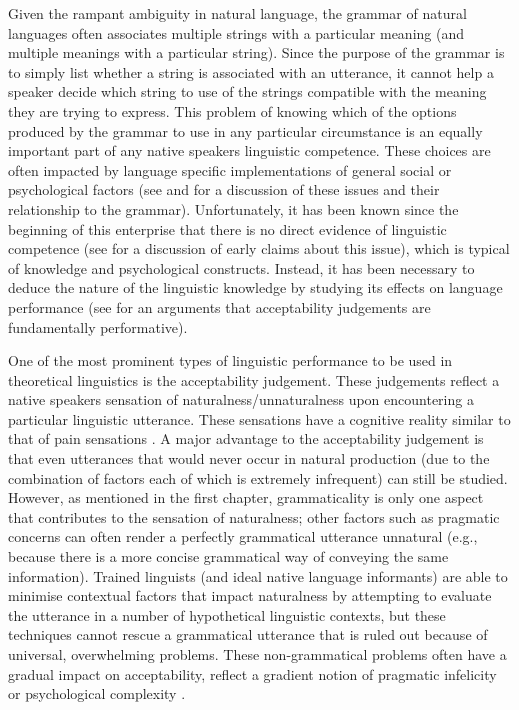 Given the rampant ambiguity in natural language, the grammar of natural languages often associates multiple strings with a particular meaning (and multiple meanings with a particular string). Since the purpose of the grammar is to simply list whether a string is associated with an utterance, it cannot help a speaker decide which string to use of the strings compatible with the meaning they are trying to express. This problem of knowing which of the options produced by the grammar to use in any particular circumstance is an equally important part of any native speakers linguistic competence. These choices are often impacted by language specific implementations of general social or psychological factors (see \cite{Bresnan.2007,Bresnan.2010,Zeevat.2014} and \cite{Tamminga.2016} for a discussion of these issues and their relationship to the grammar). Unfortunately, it has been known since the beginning of this enterprise that there is no direct evidence of linguistic competence (see \cite{Schutze.1996} for a discussion of early claims about this issue), which is typical of knowledge and psychological constructs. Instead, it has been necessary to deduce the nature of the linguistic knowledge by studying its effects on language performance (see \citealt{Stroud.2012,Phillips.2013, Phillips.2013b, Phillips.2013c} for an arguments that acceptability judgements are fundamentally performative).

One of the most prominent types of linguistic performance to be used in theoretical linguistics is the acceptability judgement. These judgements reflect a native speakers sensation of naturalness/unnaturalness upon encountering a particular linguistic utterance. These sensations have a cognitive reality similar to that of pain sensations \citep{Schutze.2014}. A major advantage to the acceptability judgement is that even utterances that would never occur in natural production (due to the combination of factors each of which is extremely infrequent) can still be studied. However, as mentioned in the first chapter, grammaticality is only one aspect that contributes to the sensation of naturalness; other factors such as pragmatic concerns can often render a perfectly grammatical utterance unnatural (e.g., because there is a more concise grammatical way of conveying the same information). Trained linguists (and ideal native language informants) are able to minimise contextual factors that impact naturalness by attempting to evaluate the utterance in a number of hypothetical linguistic contexts, but these techniques cannot rescue a grammatical utterance that is ruled out because of universal, overwhelming problems. These non-grammatical problems often have a gradual impact on acceptability, reflect a gradient notion of pragmatic infelicity or psychological complexity \citep{Bresnan.2007,Bresnan.2010,Schutze.2014}.

